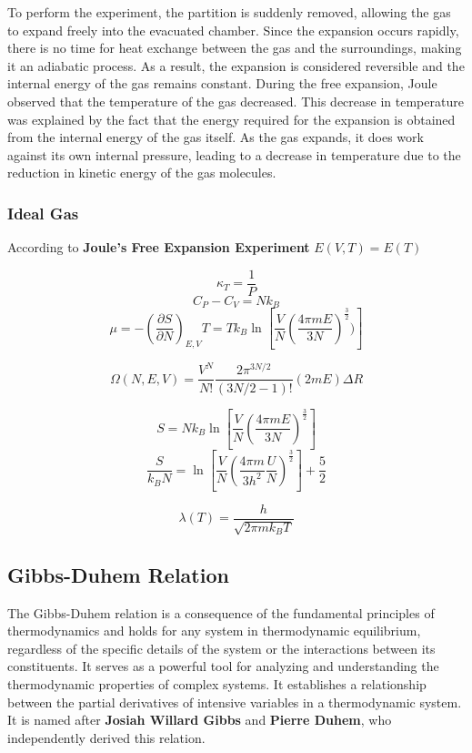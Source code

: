 \documentclass{article}
\begin{document}
To perform the experiment, the partition is suddenly removed, allowing the gas to expand freely into the evacuated chamber. Since the expansion occurs rapidly, there is no time for heat exchange between the gas and the surroundings, making it an adiabatic process. As a result, the expansion is considered reversible and the internal energy of the gas remains constant.
During the free expansion, Joule observed that the temperature of the gas decreased. This decrease in temperature was explained by the fact that the energy required for the expansion is obtained from the internal energy of the gas itself. As the gas expands, it does work against its own internal pressure, leading to a decrease in temperature due to the reduction in kinetic energy of the gas molecules.

\subsubsection{\large Ideal Gas}
According to \textbf{Joule's Free Expansion Experiment} $E(V, T) = E(T)$

$$\kappa_T = \frac{1}{P}$$
$$C_P - C_V = Nk_B$$
$$\mu = -\left(\frac{{\partial S}}{{\partial N}}\right)_{E,V}T=T k_B \ln[\frac{V}{N}\left(\frac{{4\pi m E}}{{3N}}\right)^{\frac{3}{2}})]$$

$$\Omega(N, E, V)
=\frac{{V^N}}{{N!}}\frac{{2\pi^{3N/2}}}{{(3N/2 - 1)!}}(2mE) \Delta R$$

$$ S=N k_B \ln[\frac{V}{N}\left(\frac{{4\pi m E}}{{3N}}\right)^{\frac{3}{2}}] $$
$$\frac{S}{k_B N} = \ln \left[ \frac{V}{N} \left( \frac{{4\pi m}}{{3h^2}} \frac{U}{N} \right)^{\frac{3}{2}} \right] + \frac{5}{2} $$


$$\lambda(T) = \frac{h}{{\sqrt{2\pi m k_B T}}}$$


\subsection{Gibbs-Duhem Relation}
The Gibbs-Duhem relation is a consequence of the fundamental principles of thermodynamics and holds for any system in thermodynamic equilibrium, regardless of the specific details of the system or the interactions between its constituents. It serves as a powerful tool for analyzing and understanding the thermodynamic properties of complex systems.
It establishes a relationship between the partial derivatives of intensive variables in a thermodynamic system. It is named after \textbf{Josiah Willard Gibbs} and \textbf{Pierre Duhem}, who independently derived this relation.
\end{document}
